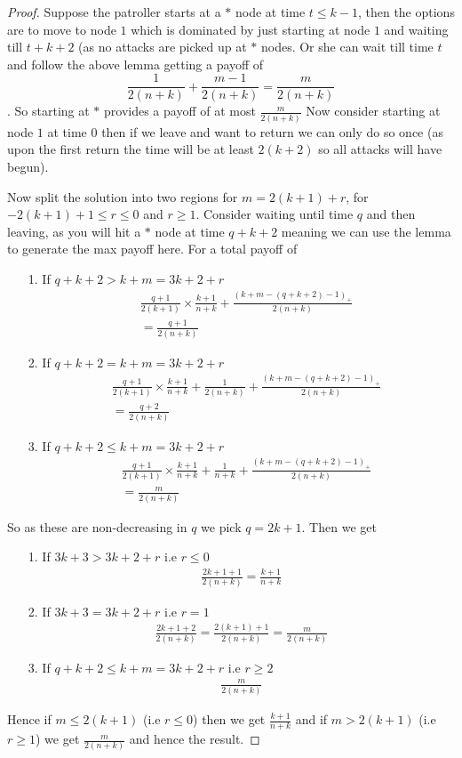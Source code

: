 \documentclass[a4paper,10pt]{article}
\newcommand{\pospart}[1]{\left( #1 \right)_{+}}
\theoremstyle{definition}
\theoremstyle{definition}
\theoremstyle{remark}
\theoremstyle{definition}
\begin{document}
\begin{proof}
Suppose the patroller starts at a $*$ node at time $t \leq k-1$, then the options are to move to node $1$ which is dominated by just starting at node $1$ and waiting till $t+k+2$ (as no attacks are picked up at $*$ nodes. Or she can wait till time $t$ and follow the above lemma getting a payoff of
$$\frac{1}{2(n+k)}+\frac{m-1}{2(n+k)}=\frac{m}{2(n+k)}$$. So starting at $*$ provides a payoff of at most $\frac{m}{2(n+k)}$
Now consider starting at node $1$ at time $0$ then if we leave and want to return we can only do so once (as upon the first return the time will be at least $2(k+2)$ so all attacks will have begun).

Now split the solution into two regions for $m=2(k+1)+r$, for $-2(k+1)+1 \leq r \leq 0$ and $r \geq 1$.
Consider waiting until time $q$ and then leaving, as you will hit a $*$ node at time $q+k+2$ meaning we can use the lemma to generate the max payoff here. For a total payoff of
\begin{itemize}
\item[1.] If $q+k+2 > k+m=3k+2+r$
\begin{align*}
&\frac{q+1}{2(k+1)} \times \frac{k+1}{n+k} + \frac{\pospart{k+m-(q+k+2)-1}}{2(n+k)} \\
&= \frac{q+1}{2(n+k)}  
\end{align*}
\item[2.] If $q+k+2=k+m=3k+2+r$
\begin{align*}
&\frac{q+1}{2(k+1)} \times \frac{k+1}{n+k}+\frac{1}{2(n+k)}
+\frac{\pospart{k+m-(q+k+2)-1}}{2(n+k)}\\
&= \frac{q+2}{2(n+k)}  
\end{align*}
\item[3.] If $q+k+2 \leq k+m=3k+2+r$
\begin{align*}
&\frac{q+1}{2(k+1)} \times \frac{k+1}{n+k}+\frac{1}{n+k}+\frac{\pospart{k+m-(q+k+2)-1}}{2(n+k)} \\
&= \frac{m}{2(n+k)}  
\end{align*}
\end{itemize}
So as these are non-decreasing in $q$ we pick $q=2k+1$.
Then we get 
\begin{itemize}
\item[1.] If $3k+3 > 3k+2+r$ i.e $r \leq 0$
\begin{align*}
\frac{2k+1+1}{2(n+k)}=\frac{k+1}{n+k}  
\end{align*}
\item[2.] If $3k+3=3k+2+r$ i.e $r=1$
\begin{align*}
\frac{2k+1+2}{2(n+k)}=\frac{2(k+1)+1}{2(n+k)}=\frac{m}{2(n+k)}  
\end{align*}
\item[3.] If $q+k+2 \leq k+m=3k+2+r$ i.e $r \geq 2$
\begin{align*}
\frac{m}{2(n+k)}  
\end{align*}
\end{itemize}

Hence if $m \leq 2(k+1)$ (i.e $r \leq 0$) then we get $\frac{k+1}{n+k}$ and if $m > 2(k+1)$ (i.e $r \geq 1 $) we get $\frac{m}{2(n+k)}$ and hence the result.
\end{proof}
\end{document}
